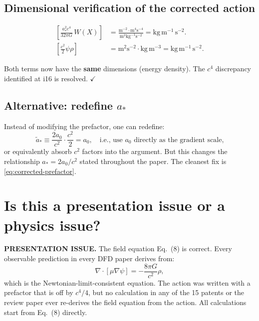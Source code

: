 \documentclass[aps,prd,twocolumn,nofootinbib]{revtex4-2}
\begin{document}
\subsection{Dimensional verification of the corrected action}

\begin{align}
\left[\frac{a_*^2 c^4}{32\pi G}\,W(X)\right]
&= \frac{\text{m}^{-2}\cdot\text{m}^4\text{s}^{-4}}
       {\text{m}^3\text{kg}^{-1}\text{s}^{-2}}
= \text{kg}\,\text{m}^{-1}\,\text{s}^{-2}. \\
\left[\frac{c^2}{2}\psi\rho\right]
&= \text{m}^2\text{s}^{-2}\cdot\text{kg}\,\text{m}^{-3}
= \text{kg}\,\text{m}^{-1}\,\text{s}^{-2}.
\end{align}

Both terms now have the \textbf{same} dimensions (energy density).
The $c^4$ discrepancy identified at i16 is resolved. $\checkmark$

\subsection{Alternative: redefine $a_*$}

Instead of modifying the prefactor, one can redefine:
\begin{equation}
\tilde{a}_* \equiv \frac{2a_0}{c^2} \cdot \frac{c^2}{2} = a_0,
\quad\text{i.e., use $a_0$ directly as the gradient scale,}
\end{equation}
or equivalently absorb $c^2$ factors into the argument. But this changes
the relationship $a_* = 2a_0/c^2$ stated throughout the paper. The
cleanest fix is \eqref{eq:corrected-prefactor}.

\section{Is this a presentation issue or a physics issue?}
\label{sec:presentation-vs-physics}

\textbf{PRESENTATION ISSUE.} The field equation Eq.~(8) is correct.
Every observable prediction in every DFD paper derives from:
\begin{equation}
\nabla\cdot[\mu\nabla\psi] = -\frac{8\pi G}{c^2}\rho,
\end{equation}
which is the Newtonian-limit-consistent equation. The action was written
with a prefactor that is off by $c^4/4$, but no calculation in any of
the 15 patents or the review paper ever re-derives the field equation
from the action. All calculations start from Eq.~(8) directly.
\end{document}
